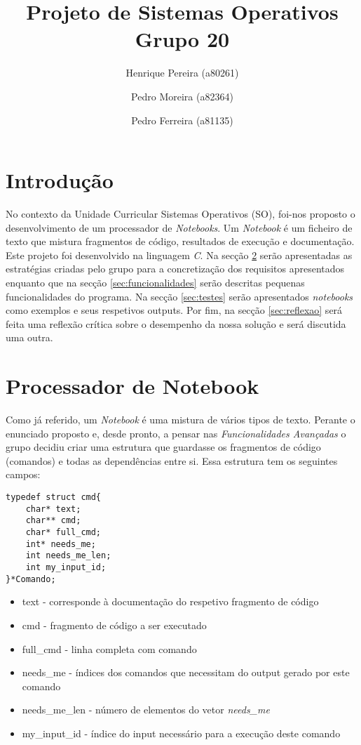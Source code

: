 \documentclass[a4paper]{article}
\title{Projeto de Sistemas Operativos\\Grupo 20}
\author{Henrique Pereira (a80261) \and Pedro Moreira (a82364) \and Pedro Ferreira (a81135) }
\begin{document}
\maketitle

\newpage

\tableofcontents

\newpage

\section{Introdução}
\label{sec:intro}

No contexto da Unidade Curricular Sistemas Operativos (SO), foi-nos proposto o desenvolvimento de um processador de \textit{Notebooks}. 
Um \textit{Notebook} é um ficheiro de texto que mistura fragmentos de código, resultados de execução e documentação. 
Este projeto foi desenvolvido na linguagem \textit{C}.
Na secção \ref{sec:note} serão apresentadas as estratégias criadas pelo grupo para a concretização dos requisitos apresentados
enquanto que na secção \ref{sec:funcionalidades} serão descritas pequenas funcionalidades do programa.
Na secção \ref{sec:testes} serão apresentados \textit{notebooks} como exemplos e seus respetivos outputs.
Por fim, na secção \ref{sec:reflexao} será feita uma reflexão crítica sobre o desempenho da nossa solução e será discutida uma outra.


\section{Processador de Notebook}
\label{sec:note}

Como já referido, um \textit{Notebook} é uma mistura de vários tipos de texto. Perante o enunciado proposto e, desde pronto, a pensar nas 
\textit{Funcionalidades Avançadas} o grupo decidiu criar uma estrutura que guardasse os fragmentos de código (comandos) e todas as dependências entre si.
Essa estrutura tem os seguintes campos: 

\begin{lstlisting}[caption=Definição da estrutura]
typedef struct cmd{
    char* text;
    char** cmd;
    char* full_cmd; 
    int* needs_me;
    int needs_me_len;
    int my_input_id;
}*Comando;
\end{lstlisting}

\begin{itemize}
  \item{text - corresponde à documentação do respetivo fragmento de código}
  \item{cmd - fragmento de código a ser executado}
  \item{full\_cmd - linha completa com comando}
  \item{needs\_me - índices dos comandos que necessitam do output gerado por este comando}
  \item{needs\_me\_len - número de elementos do vetor \textit{needs\_me}} 
  \item{my\_input\_id - índice do input necessário para a execução deste comando}
\end{itemize}
\end{document}
